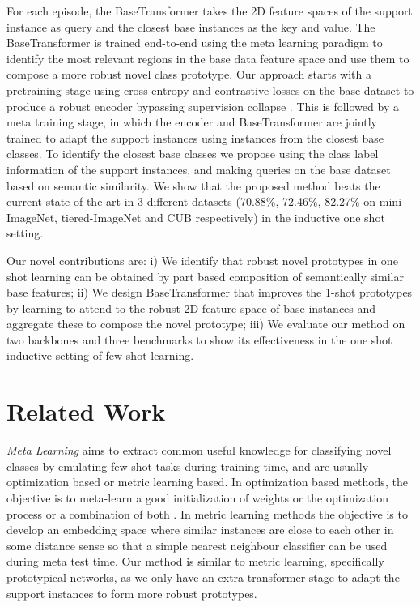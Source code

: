\documentclass{bmvc2k}
\begin{document}
For each episode, the BaseTransformer takes the 2D feature spaces of the support instance as query and the closest base instances as the key and value. The BaseTransformer is trained end-to-end using the meta learning paradigm to identify the most relevant regions in the base data feature space and use them to compose a more robust novel class prototype. Our approach starts with a pretraining stage using cross entropy and contrastive losses on the base dataset to produce a robust encoder bypassing supervision collapse \cite{doersch2020crosstransformers, mangla2020charting}. This is followed by a meta training stage, in which the encoder and BaseTransformer are jointly trained to adapt the support instances using instances from the closest base classes. To identify the closest base classes we propose using the class label information of the support instances, and making queries on the base dataset based on semantic similarity. We show that the proposed method beats the current state-of-the-art in 3 different datasets (70.88\%, 72.46\%, 82.27\% on mini-ImageNet, tiered-ImageNet and CUB respectively) in the inductive one shot setting.

Our novel contributions are: i) We identify that robust novel prototypes in one shot learning can be obtained by part based composition of semantically similar base features; ii) We design BaseTransformer that improves the 1-shot prototypes by learning to attend to the robust 2D feature space of base instances and aggregate these to compose the novel prototype; iii) We evaluate our method on two backbones and three benchmarks to show its effectiveness in the one shot inductive setting of few shot learning.  


\section{Related Work}
\textit{Meta Learning} aims to extract common useful knowledge for classifying novel classes by emulating few shot tasks during training time, and are usually optimization based or metric learning based. In optimization based methods, the objective is to meta-learn a good initialization of weights \cite{finn2017model,rusu2018metalearning,rajeswaran2019meta,zintgraf2019fast} or the optimization process \cite{ravi2017optimization,li2017meta,munkhdalai2017meta,xu2020metafun} or a combination of both \cite{park2019meta,baik2020meta}. In metric learning methods \cite{vinyals2016matching,snell2017prototypical,sung2018learning,yoon2019tapnet} the objective is to develop an embedding space where similar instances are close to each other in some distance sense so that a simple nearest neighbour classifier can be used during meta test time. Our method is similar to metric learning, specifically prototypical networks, as we only have an extra transformer stage to adapt the support instances to form more robust prototypes. 
\end{document}
